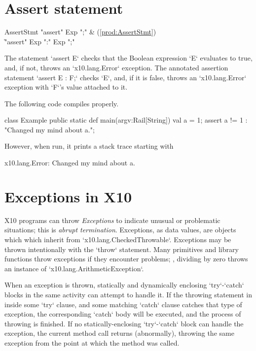 \section{Assert statement} 

\begin{bbgrammar}
          AssertStmt \: \xcd"assert" Exp \xcd";" & (\ref{prod:AssertStmt}) \\
                     \| \xcd"assert" Exp  \xcd":" Exp  \xcd";" \\
\end{bbgrammar}

The statement \xcd`assert E` checks that the Boolean expression \xcd`E`
evaluates to true, and, if not, throws an \xcd`x10.lang.Error`  exception.  
The annotated assertion statement \xcd`assert E : F;` checks \xcd`E`, and, if
it is 
false, throws an \xcd`x10.lang.Error` exception with \xcd`F`'s value attached
to it. 

\begin{ex}
The following code compiles properly.  
% 
\begin{xten}
class Example {
  public static def main(argv:Rail[String]) {
    val a = 1;
    assert a != 1 : "Changed my mind about a.";
  }
}
\end{xten}
\noindent
However, when run, it 
prints a stack trace starting with 
\begin{xten}
x10.lang.Error: Changed my mind about a.
\end{xten}
\end{ex}

\section{Exceptions in X10}

X10 programs can throw {\em Exceptions} to indicate unusual or problematic
situations; this is {\em abrupt termination}.  Exceptions, as data values, are
objects which which inherit from 
\xcd`x10.lang.CheckedThrowable`.    Exceptions may be thrown intentionally with the
\xcd`throw` statement. Many primitives and library functions throw exceptions
if they encounter problems; \eg, dividing by zero throws an instance of
\xcd`x10.lang.ArithmeticException`. 

When an exception is thrown, statically and dynamically enclosing
\xcd`try`-\xcd`catch` blocks in the same activity can attempt to handle it.   If the throwing
statement in inside some \xcd`try` clause, and some matching \xcd`catch`
clause catches that type of exception, the corresponding \xcd`catch` body will
be executed, and the process of throwing is finished.  
If no statically-enclosing \xcd`try`-\xcd`catch` block can handle the
exception, the current method call returns (abnormally), throwing the same
exception from the point at which the method was called.  

